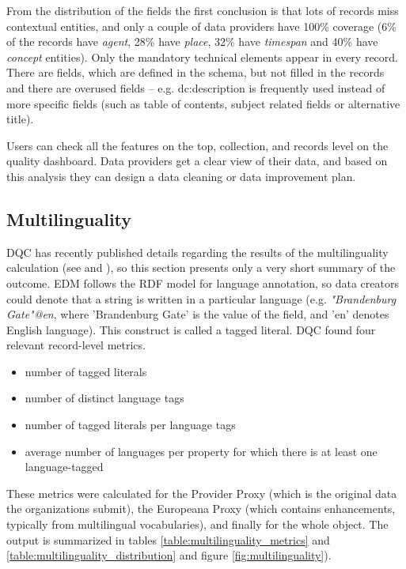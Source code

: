 From the distribution of the fields the first conclusion is that lots of records miss contextual entities, and only a couple of data providers have 100\% coverage (6\% of the records have \emph{agent}, 28\% have \emph{place}, 32\% have \emph{timespan} and 40\% have \emph{concept} entities). Only the mandatory technical elements appear in every record. There are fields, which are defined in the schema, but not filled in the records and there are overused fields – e.g. dc:description is frequently used instead of more specific fields (such as table of contents, subject related fields or alternative title).

Users can check all the features on the top, collection, and records level on the quality dashboard. Data providers get a clear view of their data, and based on this analysis they can design a data cleaning or data improvement plan.

\subsection{Multilinguality}

DQC has recently published details regarding the results of the multilinguality calculation (see \cite{charles2017} and \cite{kiraly-et-al2018}), so this section presents only a very short summary of the outcome. EDM follows the RDF model for language annotation, so data creators could denote that a string is written in a particular language (e.g. \emph{"Brandenburg Gate"@en}, where 'Brandenburg Gate' is the value of the field, and 'en' denotes English language). This construct is called a tagged literal. DQC found four relevant record-level metrics.

\begin{itemize}
 \setlength{\parskip}{0pt}
 \setlength{\itemsep}{0pt plus 1pt}
\item number of tagged literals
\item number of distinct language tags
\item number of tagged literals per language tags
\item average number of languages per property for which there is at least one language-tagged
\end{itemize}

These metrics were calculated for the Provider Proxy (which is the original data the organizations submit), the Europeana Proxy (which contains enhancements, typically from multilingual vocabularies), and finally for the whole object. The output is summarized in tables \ref{table:multilinguality_metrics} and \ref{table:multilinguality_distribution} and figure \ref{fig:multilinguality}).

